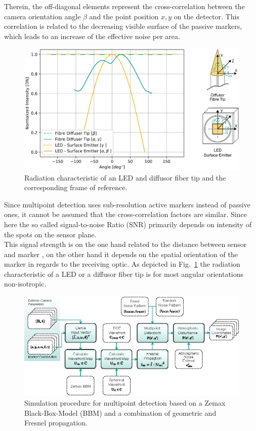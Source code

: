 \documentclass[5p,times,procedia]{elsarticle}
\begin{document}
Therein, the off-diagonal elements represent the cross-correlation between the camera orientation angle $\beta$ and the point position $x,y$ on the detector.
This correlation is related to the decreasing visible surface of the passive markers, which leads to an increase of the effective noise per area.\\
%
\begin{figure}[!htb]
	\centering
	\includegraphics[width=0.95\linewidth]{graphics/ScatteringProfile_DiffuseFibreTip.eps}
	\caption{Radiation characteristic of an LED and diffusor fiber tip and the corresponding frame of reference.}
	\label{fig:scat_profile}
\end{figure}
%
Since multipoint detection \cite{Haist2015} uses sub-resolution active markers instead of passive ones, it cannot be assumed that the cross-correlation factors are similar. Since here the so called signal-to-noise Ratio (SNR) primarily depends on intensity of the spots on the sensor plane. \\
This signal strength is on the one hand related to the distance between sensor and marker \cite{dumbleton1955}, on the other hand it depends on the spatial orientation of the marker in regards to the receiving optic. As depicted in Fig.~\ref{fig:scat_profile}
the radiation characteristic of a LED or a diffusor fiber tip \cite{Pan1994} is for most angular orientations non-isotropic.\\
%
\begin{figure}[!htb]
	\centering
	\includegraphics[width=\columnwidth]{graphics/OpticalSimulation.eps}
	\caption{Simulation procedure for multipoint detection based on a Zemax Black-Box-Model (BBM) and a combination of geometric and Fresnel propagation.}
	\label{fig:opto-sim}
\end{figure}
\end{document}

